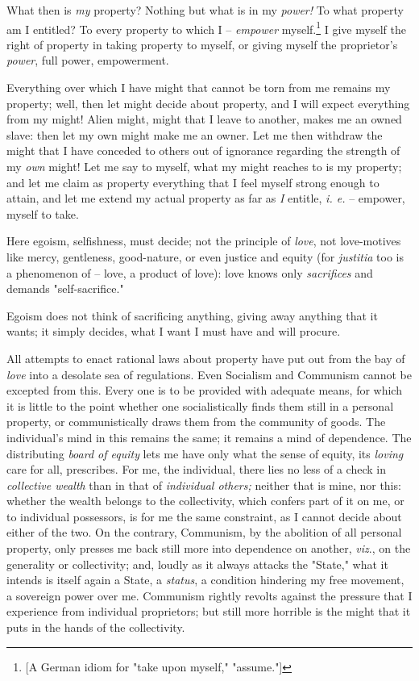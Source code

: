 What then is \textit{my} property? Nothing but what is in my \textit{power!} 
To what property am I entitled? To every property to which I -- 
\textit{empower} myself.\footnote{[A German idiom for "{}take upon myself,"{} 
"{}assume."{}]} I give myself the right of property in taking property to 
myself, or giving myself the proprietor's \textit{power}, full power, 
empowerment.

Everything over which I have might that cannot be torn from me remains my 
property; well, then let might decide about property, and I will expect 
everything from my might! Alien might, might that I leave to another, makes me 
an owned slave: then let my own might make me an owner. Let me then withdraw 
the might that I have conceded to others out of ignorance regarding the 
strength of my \textit{own} might! Let me say to myself, what my might reaches 
to is my property; and let me claim as property everything that I feel myself 
strong enough to attain, and let me extend my actual property as far as 
\textit{I} entitle, \textit{i. e.} -- empower, myself to take.

Here egoism, selfishness, must decide; not the principle of \textit{love}, not 
love-motives like mercy, gentleness, good-nature, or even justice and equity 
(for \textit{justitia} too is a phenomenon of -- love, a product of love): 
love knows only \textit{sacrifices} and demands "{}self-sacrifice."{}

Egoism does not think of sacrificing anything, giving away anything that it 
wants; it simply decides, what I want I must have and will procure.

All attempts to enact rational laws about property have put out from the bay 
of \textit{love} into a desolate sea of regulations. Even Socialism and 
Communism cannot be excepted from this. Every one is to be provided with 
adequate means, for which it is little to the point whether one 
socialistically finds them still in a personal property, or communistically 
draws them from the community of goods. The individual's mind in this remains 
the same; it remains a mind of dependence. The distributing \textit{board of 
equity} lets me have only what the sense of equity, its \textit{loving} care 
for all, prescribes. For me, the individual, there lies no less of a check in 
\textit{collective wealth} than in that of \textit{individual others;} neither 
that is mine, nor this: whether the wealth belongs to the collectivity, which 
confers part of it on me, or to individual possessors, is for me the same 
constraint, as I cannot decide about either of the two. On the contrary, 
Communism, by the abolition of all personal property, only presses me back 
still more into dependence on another, \textit{viz}., on the generality or 
collectivity; and, loudly as it always attacks the "{}State,"{} what it 
intends is itself again a State, a \textit{status}, a condition hindering my 
free movement, a sovereign power over me. Communism rightly revolts against 
the pressure that I experience from individual proprietors; but still more 
horrible is the might that it puts in the hands of the collectivity.

